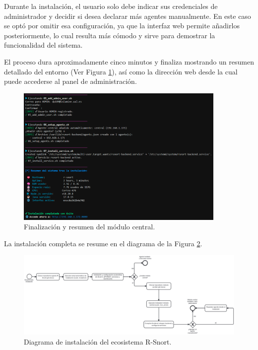 \documentclass[11pt,a4paper,twoside]{report}
\begin{document}
\newpage

Durante la instalación, el usuario solo debe indicar sus credenciales de administrador y decidir si desea declarar más agentes manualmente. En este caso se optó por omitir esa configuración, ya que la interfaz web permite añadirlos posteriormente, lo cual resulta más cómodo y sirve para demostrar la funcionalidad del sistema.\newline

El proceso dura aproximadamente cinco minutos y finaliza mostrando un resumen detallado del entorno (Ver Figura \ref{fig:fin-central-module}), así como la dirección web desde la cual puede accederse al panel de administración.

\begin{figure}[H]
	\centering
	\includegraphics[width=0.9\textwidth]{install/7.png}
	\caption{Finalización y resumen del módulo central.}
	\label{fig:fin-central-module}
\end{figure}

La instalación completa se resume en el diagrama de la Figura \ref{fig:bpmn-instalacion}.

\begin{figure}[H]
	\centering
	\includegraphics[width=1\textwidth]{documento/31.png}
	\caption{Diagrama de instalación del ecosistema R-Snort.}
	\label{fig:bpmn-instalacion}
\end{figure}
\end{document}
